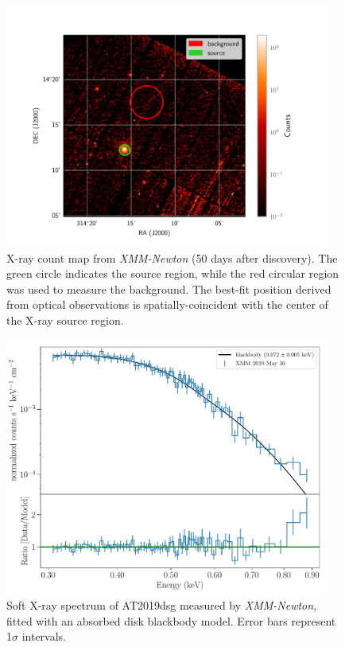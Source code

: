 \documentclass{nature_plusfigure}
\begin{document}
\begin{methods}
\begin{figure}
    \centering
    \includegraphics[width=0.95\textwidth]{Bran_XMM_epoch1_region.pdf}
    \caption{X-ray count map from \textit{XMM-Newton} (50 days after discovery). The green circle indicates the source region, while the red circular region was used to measure the background. The best-fit position derived from optical observations is spatially-coincident with the center of the X-ray source region.}
    \label{fig:xraymap}
\end{figure}

\begin{figure}
    \centering
    \includegraphics[width=0.95\textwidth]{3eyedraven_xmm_spc_0842590901_abs.pdf}
    \caption{Soft X-ray spectrum of AT2019dsg measured by \textit{XMM-Newton}, fitted with an absorbed disk blackbody model. Error bars represent 1$\sigma$ intervals.}
    \label{fig:xrayspec}
\end{figure}


\end{methods}
\end{document}
